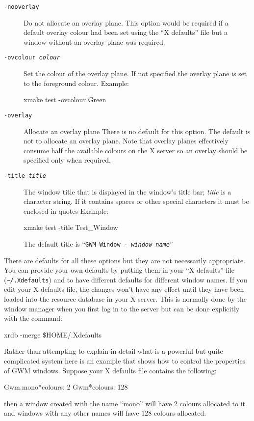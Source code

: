 \documentclass[twoside,11pt,nolof]{starlink}
\begin{document}
\begin{description}
\item[\texttt{-nooverlay}] Do not allocate an overlay plane. This option
would be required if a default overlay colour had been set using the ``X
defaults'' file  but a window without an
overlay plane was required.

\item[\texttt{-ovcolour \emph{colour}}]
Set the colour of the overlay plane. If not specified the overlay plane is set
to the foreground colour. Example:
\begin{terminalv}
xmake test -ovcolour Green
\end{terminalv}

\item[\texttt{-overlay}] Allocate an overlay plane
There is no default for this option. The default is not to
allocate an overlay plane. Note that overlay planes effectively consume half
the available colours on the X server so an overlay should be specified only
when required.

\item[\texttt{-title \emph{title}}] The window title that is displayed in the
window's title bar;
\emph{title} is a character string. If it contains spaces or other
special characters it must be enclosed in quotes
Example:
\begin{terminalv}
xmake test -title Test\_Window
\end{terminalv}
The default title is ``{\tt{GWM Window - }\emph{window name}}''

\end{description}

\label{xdefaults}There are defaults
for all these options but they are not
necessarily appropriate. You can provide your own defaults by putting
them in your ``X defaults'' file ({\tt\~{}/.Xdefaults})
and to have different defaults for different window names. If you
edit your X defaults file, the changes won't have any effect until they
have been loaded into the resource database in your X server. This is normally
done by the window manager when you first log in to the server but can
be done explicitly with the command:
\begin{terminalv}
xrdb -merge \$HOME/.Xdefaults
\end{terminalv}

Rather than attempting to explain in detail what is a powerful but quite
complicated system here is an example that shows how to control the properties
of GWM windows. Suppose your X defaults file contains the following:
\begin{terminalv}
Gwm.mono*colours: 2
Gwm*colours: 128
\end{terminalv}
then a window created with the name ``mono'' will have 2 colours allocated to
it and windows with any other names will have 128 colours allocated.
\end{document}
